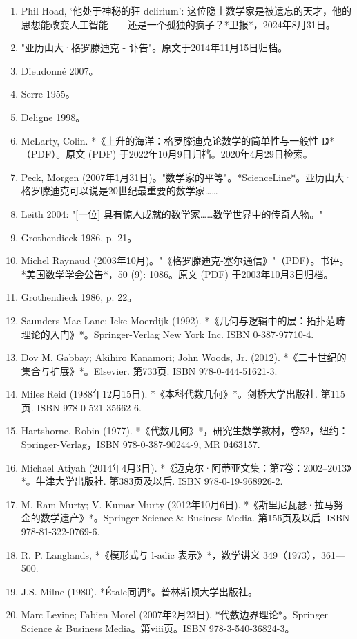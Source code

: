 \begin{enumerate}
\item Phil Hoad, ‘他处于神秘的狂 delirium’: 这位隐士数学家是被遗忘的天才，他的思想能改变人工智能——还是一个孤独的疯子？*卫报*，2024年8月31日。
\item "亚历山大·格罗滕迪克 - 讣告"。原文于2014年11月15日归档。  
\item Dieudonné 2007。  
\item Serre 1955。  
\item Deligne 1998。  
\item McLarty, Colin. *《上升的海洋：格罗滕迪克论数学的简单性与一般性 I》*（PDF）。原文 (PDF) 于2022年10月9日归档。2020年4月29日检索。  
\item Peck, Morgen (2007年1月31日)。"数学家的平等"。*ScienceLine*。亚历山大·格罗滕迪克可以说是20世纪最重要的数学家……  
\item Leith 2004: "[一位] 具有惊人成就的数学家……数学世界中的传奇人物。"  
\item Grothendieck 1986, p. 21。  
\item Michel Raynaud (2003年10月)。"《格罗滕迪克-塞尔通信》"（PDF）。书评。*美国数学学会公告*，50 (9): 1086。原文 (PDF) 于2003年10月3日归档。  
\item Grothendieck 1986, p. 22。
\item Saunders Mac Lane; Ieke Moerdijk (1992). *《几何与逻辑中的层：拓扑范畴理论的入门》*。Springer-Verlag New York Inc. ISBN 0-387-97710-4.  
\item Dov M. Gabbay; Akihiro Kanamori; John Woods, Jr. (2012). *《二十世纪的集合与扩展》*。Elsevier. 第733页. ISBN 978-0-444-51621-3.  
\item Miles Reid (1988年12月15日). *《本科代数几何》*。剑桥大学出版社. 第115页. ISBN 978-0-521-35662-6.  
\item Hartshorne, Robin (1977). *《代数几何》*，研究生数学教材，卷52，纽约：Springer-Verlag，ISBN 978-0-387-90244-9, MR 0463157.  
\item Michael Atiyah (2014年4月3日). *《迈克尔·阿蒂亚文集：第7卷：2002–2013》*。牛津大学出版社. 第383页及以后. ISBN 978-0-19-968926-2.  
\item M. Ram Murty; V. Kumar Murty (2012年10月6日). *《斯里尼瓦瑟·拉马努金的数学遗产》*。Springer Science & Business Media. 第156页及以后. ISBN 978-81-322-0769-6.  
\item R. P. Langlands, *《模形式与 l-adic 表示》*，数学讲义 349（1973），361—500.  
\item J.S. Milne (1980). *Étale同调*。普林斯顿大学出版社。  
\item Marc Levine; Fabien Morel (2007年2月23日). *代数边界理论*。Springer Science & Business Media。第viii页。ISBN 978-3-540-36824-3。  

\end{enumerate}
